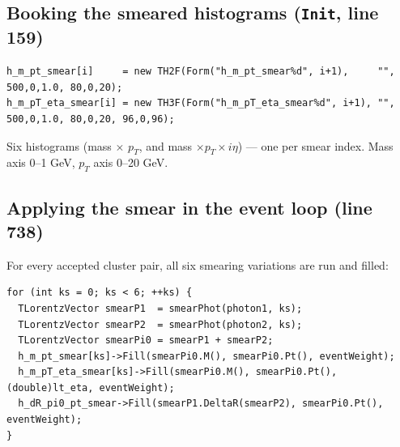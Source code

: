 \documentclass[11pt]{article}
\begin{document}
\subsection{Booking the smeared histograms (\texttt{Init}, line 159)}
\begin{lstlisting}[firstnumber=159]
h_m_pt_smear[i]     = new TH2F(Form("h_m_pt_smear%d", i+1),     "", 500,0,1.0, 80,0,20);
h_m_pT_eta_smear[i] = new TH3F(Form("h_m_pT_eta_smear%d", i+1), "", 500,0,1.0, 80,0,20, 96,0,96);
\end{lstlisting}
Six histograms (mass $\times$ $p_T$, and mass $\times p_T\times i\eta$) --- one per
smear index. Mass axis 0--1 GeV, $p_T$ axis 0--20 GeV.

\subsection{Applying the smear in the event loop (line 738)}
For every accepted cluster pair, all six smearing variations are run and filled:
\begin{lstlisting}[firstnumber=738]
for (int ks = 0; ks < 6; ++ks) {
  TLorentzVector smearP1  = smearPhot(photon1, ks);
  TLorentzVector smearP2  = smearPhot(photon2, ks);
  TLorentzVector smearPi0 = smearP1 + smearP2;
  h_m_pt_smear[ks]->Fill(smearPi0.M(), smearPi0.Pt(), eventWeight);
  h_m_pT_eta_smear[ks]->Fill(smearPi0.M(), smearPi0.Pt(), (double)lt_eta, eventWeight);
  h_dR_pi0_pt_smear->Fill(smearP1.DeltaR(smearP2), smearPi0.Pt(), eventWeight);
}
\end{lstlisting}
\end{document}

